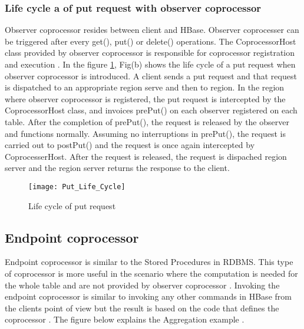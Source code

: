 \documentclass[11pt,a4paper,bibtotoc,idxtotoc,headsepline,footsepline,footexclude,BCOR12mm,DIV13]{scrbook}
\begin{document}
\subsubsection{Life cycle a of put request with observer coprocessor}
\label{subsubsec:Life cycle of put request with observer coprocessor}

Observer coprocessor resides between client and HBase. Observer coprocesser can be triggered after every get(), put() or delete() operations. The CoprocessorHost class provided by observer coprocessor is responsible for coprocessor registration and execution \cite{coprocessor:detail}. In the figure \ref{Life cycle of put request}, Fig(b) shows the life cycle of a put request when observer coprocessor is introduced. A client sends a put request and that request is dispatched to an appropriate region serve and then to region. In the region where observer coprocessor is registered, the put request is intercepted by the CoprocessorHost class, and invoices prePut() on each observer registered on each table. After the completion of prePut(), the request is released by the observer and functions normally. Assuming no interruptions in prePut(), the request is carried out to postPut() and the request is once again intercepted by CoprocesserHost. After the request is released, the request is dispached region server and the region server returns the response to the client.

\begin{figure}
	\centering
	\texttt{[image: Put\_Life\_Cycle]}
	\caption{Life cycle of put request}
	\label{Life cycle of put request}
	
\end{figure}


%	
%
%    

\newpage
\subsection{Endpoint coprocessor}

Endpoint coprocessor is similar to the Stored Procedures in RDBMS. This type of coprocessor is more useful in the scenario where the computation is needed for the whole table and are not provided by observer coprocessor \cite{hbase:coprocessors}. Invoking the endpoint coprocessor is similar to invoking any other commands in HBase from the client\textquotesingle s point of view but the result is based on the code that defines the coprocessor \cite{coprocessor:detail}. The figure below explains the Aggregation example \cite{coprocessor:detail}.
\end{document}
